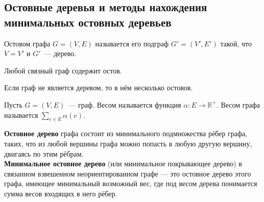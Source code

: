 \subsection{Остовные деревья и методы нахождения минимальных остовных деревьев}


Остовом графа $G = (V, E)$ называется его подграф $G' = (V', E')$ такой, что $V = V'$ и $G'$~--- дерево.


\begin{statement}
	Любой связный граф содержит остов.
\end{statement}

\begin{statement}
	Если граф не является деревом, то в нём несколько остовов.
\end{statement}


Пусть $G = (V, E)$~--- граф. Весом называется функция $\alpha \colon E \to \mathbb{R}^+$. Весом графа называется $\sum_{e \in E} \alpha(e)$.

\textbf{Остовное дерево} графа состоит из минимального подмножества рёбер графа, таких, что из любой вершины графа можно попасть в любую другую вершину, двигаясь по этим рёбрам.\\
\textbf{Минимальное остовное дерево }(или минимальное покрывающее дерево) в связанном взвешенном неориентированном графе — это остовное дерево этого графа, имеющее минимальный возможный вес, где под весом дерева понимается сумма весов входящих в него рёбер.

